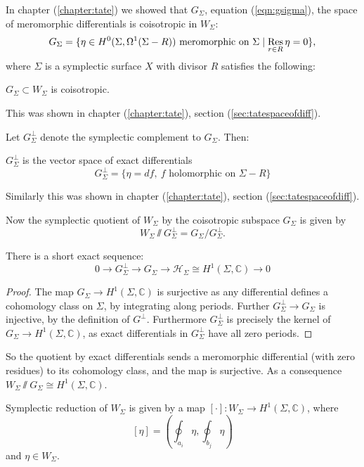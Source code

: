     In chapter (\ref{chapter:tate}) we showed that         
    \( G_\Sigma\), equation (\ref{eqn:gsigma}), the space of meromorphic differentials is coisotropic in \(W_\Sigma\):
     \begin{equation} 
         G_\Sigma=\{ \eta\in H^0(\Sigma,\Omega^1(\Sigma-R)) \text{\ meromorphic on }\Sigma\mid\operatorname*{Res}_{r\in R}\eta=0\},
     \end{equation}
    where \( \Sigma \) is a symplectic surface \(X\) with divisor \(R\) satisfies the following:
    \begin{lem}  \label{coisotropic}
        \(G_\Sigma\subset W_{\Sigma}\) is coisotropic.
    \end{lem}
    This was shown in chapter (\ref{chapter:tate}), section (\ref{sec:tatespaceofdiff}).
    
    Let \(G_\Sigma^{\perp}\) denote the symplectic complement to \(G_\Sigma\). Then: 
    \begin{lem}
    \( G_\Sigma^{\perp}\) is the vector space of exact differentials
    \[ G_\Sigma^{\perp}=\{ \eta=df,\  f \text{\ holomorphic on }\Sigma-R\}
    \] 
    \end{lem}
    Similarly this was shown in chapter (\ref{chapter:tate}), section (\ref{sec:tatespaceofdiff}).
    
    Now the symplectic quotient of \(W_\Sigma\) by the coisotropic subspace \(G_\Sigma\) is given by
    \[ W_\Sigma \sslash G_\Sigma^\perp = G_\Sigma / G_\Sigma^{\perp}.\]
    
    
    \begin{lem} There is a short exact sequence:
    \[0 \rightarrow G_\Sigma^{\perp} \rightarrow G_\Sigma   \rightarrow \mathcal{H}_\Sigma \cong H^1(\Sigma,\mathbb{C}) \rightarrow 0 \]
    \end{lem}
    
    
    \begin{proof}
    The map \(G_\Sigma \rightarrow H^1(\Sigma, \mathbb{C}) \) is surjective as any differential defines a cohomology class on \(\Sigma\), by integrating along periods. Further \(G^{\perp}_\Sigma \rightarrow G_\Sigma \) is injective, by the definition of \(G^{\perp}\). Furthermore \(G_\Sigma^{\perp}\) is precisely the kernel of \(G_\Sigma \rightarrow H^1( \Sigma, \mathbb{C})\), as exact differentials in \( G^{\perp}_\Sigma\) have all zero periods.
    \end{proof}
    
    So the quotient by exact differentials sends a meromorphic differential (with zero residues) to its cohomology class, and the map is surjective. As a consequence \(W_\Sigma \sslash G_\Sigma \cong H^1(\Sigma , \mathbb{C})\). 
    \begin{lem} Symplectic reduction of \(W_\Sigma\) is given by a map \( [ \cdot ] : W_\Sigma \rightarrow H^1(\Sigma, \mathbb{C})\), where
    \[ [ \eta ] = \left( \oint_{a_i} \eta, \oint_{b_j} \eta \right) \]
    and \( \eta \in W_\Sigma\).
    \end{lem}
    
